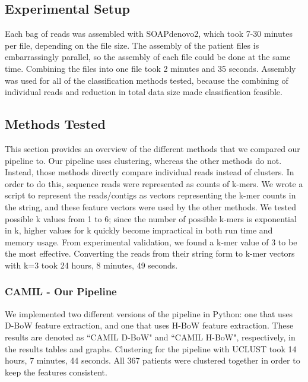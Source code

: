 
\subsection{Experimental Setup}

Each bag of reads was assembled with SOAPdenovo2, which took 7-30 minutes per file, depending on the file size. The assembly of the patient files is embarrassingly parallel, so the assembly of each file could be done at the same time. Combining the files into one file took 2 minutes and 35 seconds. Assembly was used for all of the classification methods tested, because the combining of individual reads and reduction in total data size made classification feasible.

\subsection{Methods Tested}

This section provides an overview of the different methods that we compared our pipeline to. Our pipeline uses clustering, whereas the other methods do not. Instead, those methods directly compare individual reads instead of clusters. In order to do this, sequence reads were represented as counts of k-mers. %
We wrote a script to represent the reads/contigs as vectors representing the k-mer counts in the string, and these feature 
vectors were used by the other methods. We tested possible k values 
from 1 to 6; since the number of possible k-mers is 
exponential in k, higher values for k quickly become impractical in both run time and memory usage. From experimental validation, we found a k-mer value of 3 to be the most effective. Converting the reads from their string form to k-mer vectors with k=3 took 24 hours, 8 minutes, 49 seconds.


\subsubsection{CAMIL - Our Pipeline}

We implemented two different versions of the pipeline in Python: one that uses D-BoW feature extraction, and one that uses H-BoW feature extraction. These results are denoted as ``CAMIL D-BoW" and ``CAMIL H-BoW", respectively, in the results tables and graphs. Clustering for the pipeline with UCLUST took 14 hours, 7 minutes, 44 seconds. All 367 patients were clustered together in order to keep the features consistent.

